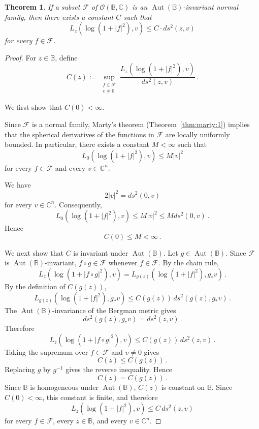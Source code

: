 \documentclass[10pt,a4paper]{amsart}
\newtheorem{thm}{Theorem}
\newcommand{\C}{\mathbb{C}}
\begin{document}
    \begin{thm}
        \label{thm:norm-manif-1}
        If a subset $\mathcal{F}$ of $\mathcal{O}(\mathbb{B}, \C)$ is an $\operatorname{Aut}(\mathbb{B})$-invariant normal family, then there exists a constant $C$ such that
        \begin{equation}
            L_z(\log(1+|f|^2),v)\leq C \cdot ds^2(z,v)
            \label{eq:norm-inequality}
        \end{equation}
        for every $f \in \mathcal{F}$.
    \end{thm}

    \begin{proof}
        For $z\in\mathbb{B}$, define
        \[
            C(z) := \sup_{\substack{f\in\mathcal{F}\\v\ne0}}\frac{ L_z\left(\log(1+|f|^2),v\right) }{ ds^2(z,v) }\,.
        \]

        We first show that $C(0)<\infty$.

        Since $\mathcal{F}$ is a normal family, Marty's theorem (Theorem~\ref{thm:marty:1}) implies that the spherical derivatives of the functions in $\mathcal{F}$ are locally uniformly bounded.
        In particular, there exists a constant $M<\infty$ such that
        \[
            L_0\left(\log(1+|f|^2),v\right)\leq M|v|^2
        \]
        for every $f\in\mathcal{F}$ and every $v\in\C^n$.

        We have
        \[
            2|v|^2=ds^2(0,v)
        \]
        for every $v\in\C^n$.
        Consequently,
        \[
            L_0\left(\log(1+|f|^2),v\right) \leq M|v|^2\leq Mds^2(0,v)\,.
        \]
        Hence
        \[
            C(0)\leq M<\infty\,.
        \]

        We next show that $C$ is invariant under $\operatorname{Aut}(\mathbb{B})$.
        Let $g\in\operatorname{Aut}(\mathbb{B})$.
        Since $\mathcal{F}$ is $\operatorname{Aut}(\mathbb{B})$-invariant, $f\circ g\in\mathcal{F}$ whenever $f\in\mathcal{F}$.
        By the chain rule,
        \[
            L_z\left(\log(1+|f\circ g|^2),v\right) = L_{g(z)}\left(\log(1+|f|^2),g_{*}v\right)\,.
        \]
        By the definition of $C(g(z))$,
        \[
            L_{g(z)}\left(\log(1+|f|^2),g_{*}v\right) \leq C(g(z))\,ds^2(g(z),g_{*}v)\,.
        \]
        The $\operatorname{Aut}(\mathbb{B})$-invariance of the Bergman metric gives
        \[
            ds^2(g(z),g_{*}v)=ds^2(z,v)\,.
        \]
        Therefore
        \[
            L_z\left(\log(1+|f\circ g|^2),v\right) \leq C(g(z))\,ds^2(z,v)\,.
        \]
        Taking the supremum over $f\in\mathcal{F}$ and $v\neq0$ gives
        \[
            C(z)\leq C(g(z))\,.
        \]
        Replacing $g$ by $g^{-1}$ gives the reverse inequality.
        Hence
        \[
            C(z)=C(g(z))\,.
        \]
        Since $\mathbb{B}$ is homogeneous under $\operatorname{Aut}(\mathbb{B})$, $C(z)$ is constant on $\mathbb{B}$.
        Since $C(0)<\infty$, this constant is finite, and therefore
        \[
            L_z\left(\log(1+|f|^2),v\right) \leq C\,ds^2(z,v)
        \]
        for every $f\in\mathcal{F}$, every $z\in\mathbb{B}$, and every $v\in\C^n$.
    \end{proof}
\end{document}
